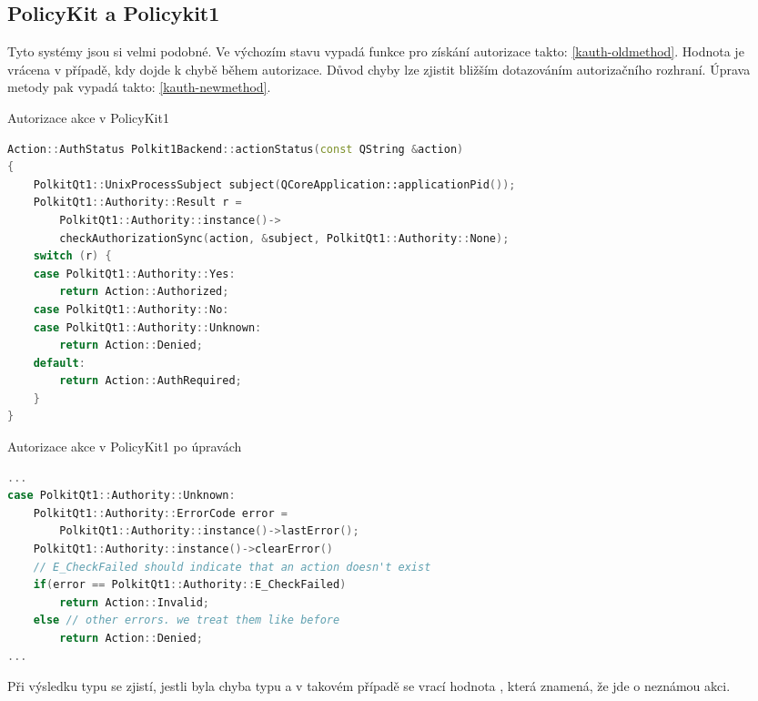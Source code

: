 \subsection*{PolicyKit a Policykit1}
Tyto systémy jsou si velmi podobné. Ve výchozím stavu vypadá funkce pro získání autorizace takto: \ref{kauth-oldmethod}. Hodnota  je vrácena v případě, kdy dojde k chybě během autorizace. Důvod chyby lze zjistit bližším dotazováním autorizačního rozhraní. Úprava metody pak vypadá takto: \ref{kauth-newmethod}.
\begin{mylisting}
\caption{Autorizace akce v PolicyKit1}
\label{kauth-oldmethod}
\begin{lstlisting}[language=C++]
Action::AuthStatus Polkit1Backend::actionStatus(const QString &action)
{
    PolkitQt1::UnixProcessSubject subject(QCoreApplication::applicationPid());
    PolkitQt1::Authority::Result r =
        PolkitQt1::Authority::instance()->
        checkAuthorizationSync(action, &subject, PolkitQt1::Authority::None);
    switch (r) {
    case PolkitQt1::Authority::Yes:
        return Action::Authorized;
    case PolkitQt1::Authority::No:
    case PolkitQt1::Authority::Unknown:
        return Action::Denied;
    default:
        return Action::AuthRequired;
    }
}
\end{lstlisting}
\end{mylisting}
\begin{mylisting}
\caption{Autorizace akce v PolicyKit1 po úpravách}
\label{kauth-newmethod}
\begin{lstlisting}[language=C++]
...
case PolkitQt1::Authority::Unknown:
    PolkitQt1::Authority::ErrorCode error =
        PolkitQt1::Authority::instance()->lastError();
    PolkitQt1::Authority::instance()->clearError()
    // E_CheckFailed should indicate that an action doesn't exist
    if(error == PolkitQt1::Authority::E_CheckFailed)
        return Action::Invalid;
    else // other errors. we treat them like before
        return Action::Denied;
...
\end{lstlisting}
\end{mylisting}
Při výsledku typu  se zjistí, jestli byla chyba typu  a v takovém případě se vrací hodnota , která znamená, že jde o neznámou akci.
